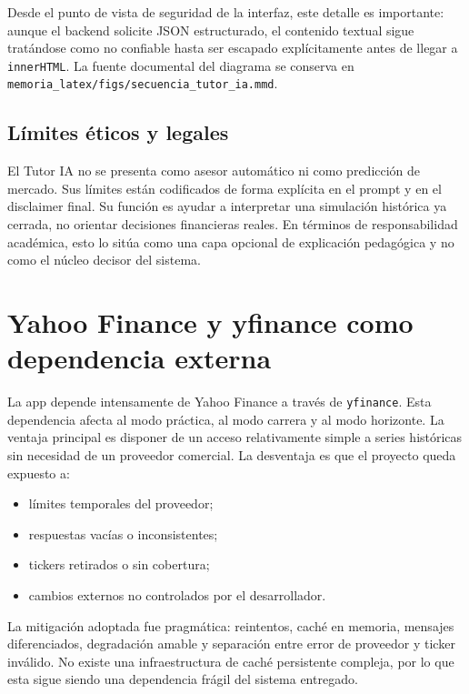 Desde el punto de vista de seguridad de la interfaz, este detalle es importante: aunque el backend solicite JSON estructurado, el contenido textual sigue tratándose como no confiable hasta ser escapado explícitamente antes de llegar a \texttt{innerHTML}. La fuente documental del diagrama se conserva en \texttt{memoria\_latex/figs/secuencia\_tutor\_ia.mmd}.

\subsection{Límites éticos y legales}

El Tutor IA no se presenta como asesor automático ni como predicción de mercado. Sus límites están codificados de forma explícita en el prompt y en el disclaimer final. Su función es ayudar a interpretar una simulación histórica ya cerrada, no orientar decisiones financieras reales. En términos de responsabilidad académica, esto lo sitúa como una capa opcional de explicación pedagógica y no como el núcleo decisor del sistema.

\section{Yahoo Finance y yfinance como dependencia externa}

La app depende intensamente de Yahoo Finance a través de \texttt{yfinance}. Esta dependencia afecta al modo práctica, al modo carrera y al modo horizonte. La ventaja principal es disponer de un acceso relativamente simple a series históricas sin necesidad de un proveedor comercial. La desventaja es que el proyecto queda expuesto a:

\begin{itemize}
    \item límites temporales del proveedor;
    \item respuestas vacías o inconsistentes;
    \item tickers retirados o sin cobertura;
    \item cambios externos no controlados por el desarrollador.
\end{itemize}

La mitigación adoptada fue pragmática: reintentos, caché en memoria, mensajes diferenciados, degradación amable y separación entre error de proveedor y ticker inválido. No existe una infraestructura de caché persistente compleja, por lo que esta sigue siendo una dependencia frágil del sistema entregado.

